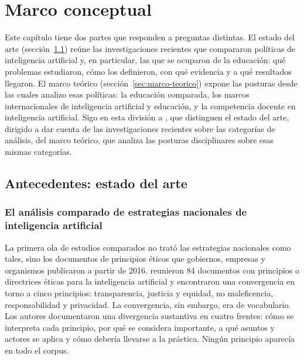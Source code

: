 
\providecommand{\pendiente}[1]{\textbf{[Pendiente: #1]}}

\chapter{Marco conceptual}
\label{cap:marco-conceptual}

Este capítulo tiene dos partes que responden a preguntas distintas. El estado del arte
(sección~\ref{sec:estado-arte}) reúne las investigaciones recientes que compararon
políticas de inteligencia artificial y, en particular, las que se ocuparon de la educación:
qué problemas estudiaron, cómo los definieron, con qué evidencia y a qué resultados
llegaron. El marco teórico (sección~\ref{sec:marco-teorico}) expone las posturas desde las
cuales analizo esas políticas: la educación comparada, los marcos internacionales de
inteligencia artificial y educación, y la competencia docente en inteligencia artificial.
Sigo en esta división a \citet{londono2014guia}, que distinguen el estado del arte, dirigido
a dar cuenta de las investigaciones recientes sobre las categorías de análisis, del marco
teórico, que analiza las posturas disciplinares sobre esas mismas categorías.

\section{Antecedentes: estado del arte}
\label{sec:estado-arte}

\subsection{El análisis comparado de estrategias nacionales de inteligencia artificial}
\label{subsec:ea-estrategias}

La primera ola de estudios comparados no trató las estrategias nacionales como tales, sino
los documentos de principios éticos que gobiernos, empresas y organismos publicaron a partir
de 2016. \citet{jobin2019landscape} reunieron 84 documentos con principios o directrices
éticas para la inteligencia artificial y encontraron una convergencia en torno a cinco
principios: transparencia, justicia y equidad, no maleficencia, responsabilidad y
privacidad. La convergencia, sin embargo, era de vocabulario. Los autores documentaron una
divergencia sustantiva en cuatro frentes: cómo se interpreta cada principio, por qué se
considera importante, a qué asuntos y actores se aplica y cómo debería llevarse a la
práctica. Ningún principio aparecía en todo el corpus.

